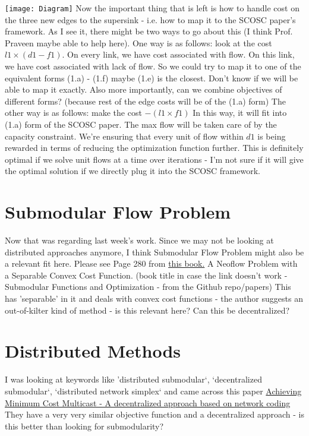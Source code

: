 \documentclass{article}
\begin{document}
\break
\break
\texttt{[image: Diagram]}
\break
Now the important thing that is left is how to handle cost on the three new edges to the supersink - i.e. how to map it to the SCOSC paper's framework. As I see it, there might be two ways to go about this (I think Prof. Praveen maybe able to help here). 
\break
\break
One way is as follows: look at the cost $l1 \times (d1 - f1)$. On every link, we have cost associated with flow. On this link, we have cost associated with lack of flow. So we could try to map it to one of the equivalent forms (1.a) - (1.f) maybe (1.e) is the closest. Don't know if we will be able to map it exactly. Also more importantly, can we combine objectives of different forms? (because rest of the edge costs will be of the (1.a) form)
\break
\break
The other way is as follows: make the cost $- (l1 \times f1)$ In this way, it will fit into (1.a) form of the SCOSC paper. The max flow will be taken care of by the capacity constraint. We're ensuring that every unit of flow within $d1$ is being rewarded in terms of reducing the optimization function further. This is definitely optimal if we solve unit flows at a time over iterations - I'm not sure if it will give the optimal solution if we directly plug it into the SCOSC framework.

\section{Submodular Flow Problem}
Now that was regarding last week's work. Since we may not be looking at distributed approaches anymore, I think Submodular Flow Problem might also be a relevant fit here. Please see Page 280 from \href{https://github.com/Ras-al-Ghul/Perishable-Flow-Optimization/blob/master/Papers/Submodular-Functions-and-Optimization.pdf}{this book.} A Neoflow Problem with a Separable Convex Cost Function. (book title in case the link doesn't work - Submodular Functions and Optimization - from the Github repo/papers) This has 'separable' in it and deals with convex cost functions - the author suggests an out-of-kilter kind of method - is this relevant here? Can this be decentralized?

\section{Distributed Methods}
I was looking at keywords like 'distributed submodular`, `decentralized submodular`, `distributed network simplex` and came across this paper \href{http://www.rle.mit.edu/ncrc/wp-content/uploads/2014/02/2005_achieving.pdf}{Achieving Minimum Cost Multicast - A decentralized approach based on network coding} They have a very very similar objective function and a decentralized approach - is this better than looking for submodularity?
\end{document}
